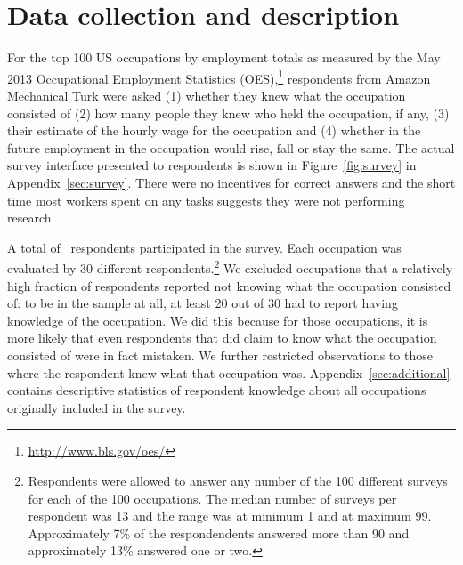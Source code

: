 \documentclass[11pt]{article}
\begin{document}

\section{Data collection and description} 

For the top 100 US occupations by employment totals as measured by the May 2013 Occupational Employment Statistics (OES),\footnote{\url{http://www.bls.gov/oes/}}  respondents from Amazon Mechanical Turk were asked
(1) whether they knew what the occupation consisted of 
(2) how many people they knew who held the occupation, if any,  
(3) their estimate of the hourly wage for the occupation
and (4) whether in the future employment in the occupation would rise, fall or stay the same.
The actual survey interface presented to respondents is shown in Figure~\ref{fig:survey} in Appendix~\ref{sec:survey}. 
There were no incentives for correct answers and the short time most workers spent on any tasks suggests they were not performing research. 

A total of \numRaters\, respondents participated in the survey. 
Each occupation was evaluated by 30 different respondents.\footnote
{
Respondents were allowed to answer any number of the 100 different surveys for each of the 100 occupations. The median number of surveys per respondent was 13 and the range was at minimum 1 and at maximum 99. Approximately 7\% of the respondendents answered more than 90 and approximately 13\% answered one or two. 
}
We excluded occupations that a relatively high fraction of respondents reported not knowing what the occupation consisted of: 
to be in the sample at all, at least 20 out of 30 had to report having knowledge of the occupation.
We did this because for those occupations, it is more likely that even respondents that did claim to know what the occupation consisted of were in fact mistaken.  
We further restricted observations to those where the respondent knew what that occupation was. 
Appendix~\ref{sec:additional} contains descriptive statistics of respondent knowledge about all occupations originally included in the survey.   
\end{document}
